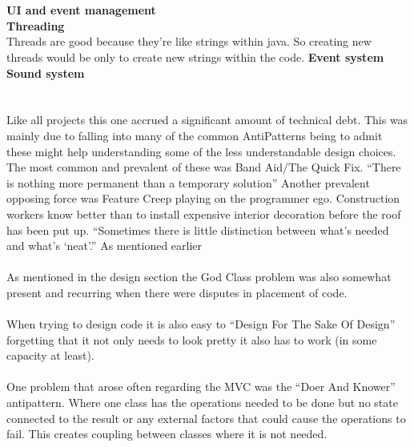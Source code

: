 \documentclass[main.tex]{subfiles}
\begin{document}
\\ \\
\textbf{UI and event management} \\%
\textbf{Threading} \\%
Threads are good because they’re like strings within java. So creating new threads would be only to create new strings within the code.
\textbf{Event system} \\%
\textbf{Sound system} \\%
\\ \\
Like all projects this one accrued a significant amount of technical debt. This was mainly due to falling into many of the common AntiPatterns being to admit these might help understanding some of the less understandable design choices. The most common and prevalent of these was Band Aid/The Quick Fix. 
“There is nothing more permanent than a temporary solution”
Another prevalent opposing force was Feature Creep playing on the programmer ego. Construction workers know better than to install expensive interior decoration before the roof has been put up.
“Sometimes there is little distinction between what's needed and what's ‘neat’.”
As mentioned earlier 
\\ \\
As mentioned in the design section the God Class problem was also somewhat present and recurring when there were disputes in placement of code.
\\ \\
When trying to design code it is also easy to “Design For The Sake Of Design” forgetting that it not only needs to look pretty it also has to work (in some capacity at least).
\\ \\
One problem that arose often regarding the MVC was the “Doer And Knower” antipattern. Where one class has the operations needed to be done but no state connected to the result or any external factors that could cause the operations to fail. This creates coupling between classes where it is not needed.
\end{document}
